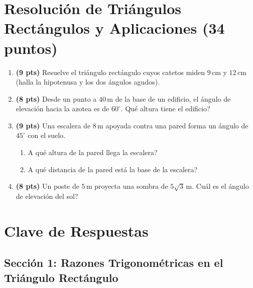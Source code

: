 \documentclass[12pt, letterpaper]{article}
\begin{document}
\newpage

\section{Resolución de Triángulos Rectángulos y Aplicaciones (34 puntos)}

\begin{enumerate}[leftmargin=*]
  \item \textbf{(9 pts)} Resuelve el triángulo rectángulo cuyos catetos miden $9$\,cm y $12$\,cm (halla la hipotenusa y los dos ángulos agudos).

  \item \textbf{(8 pts)} Desde un punto a $40$\,m de la base de un edificio, el ángulo de elevación hacia la azotea es de $60^{\circ}$. \textquestiondown Qué altura tiene el edificio?

  \item \textbf{(9 pts)} Una escalera de $8$\,m apoyada contra una pared forma un ángulo de $45^{\circ}$ con el suelo.
        \begin{enumerate}[label=\alph*)]
          \item \textquestiondown A qué altura de la pared llega la escalera?
          \item \textquestiondown A qué distancia de la pared está la base de la escalera?
        \end{enumerate}

  \item \textbf{(8 pts)} Un poste de $5$\,m proyecta una sombra de $5\sqrt{3}$\,m. \textquestiondown Cuál es el ángulo de elevación del sol?
\end{enumerate}

\newpage

\ifmwclaves
  \section{Clave de Respuestas}

  \subsection*{Sección 1: Razones Trigonométricas en el Triángulo Rectángulo}
\end{document}
